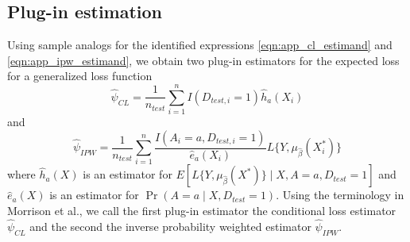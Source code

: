     \subsection{Plug-in estimation}
    Using sample analogs for the identified expressions \ref{eqn:app_cl_estimand} and \ref{eqn:app_ipw_estimand}, we obtain two plug-in estimators for the expected loss for a generalized loss function
    \begin{equation*}
        \widehat{\psi}_{CL} = \frac{1}{n_{test}}\sum_{i=1}^nI(D_{test, i} = 1)\widehat{h}_a(X_i)
    \end{equation*}
    and 
    \begin{equation*}
        \widehat{\psi}_{IPW} = \frac{1}{n_{test}} \sum_{i=1}^n \frac{I(A_i = a, D_{test, i} = 1)}{ \widehat{e}_a(X_i)} L\{Y, \mu_{\widehat{\beta}}(X^*_i)\}
    \end{equation*}
    where $\widehat{h}_a(X)$ is an estimator for $E[L\{Y, \mu_{\widehat{\beta}}(X^*)\}\mid X,A = a, D_{test} = 1]$ and $\widehat{e}_a(X)$ is an estimator for $\Pr(A = a \mid X,D_{test} = 1)$. Using the terminology in Morrison et al., we call the first plug-in estimator the conditional loss estimator $ \widehat{\psi}_{CL}$ and the second the inverse probability weighted estimator $\widehat{\psi}_{IPW}$. 

